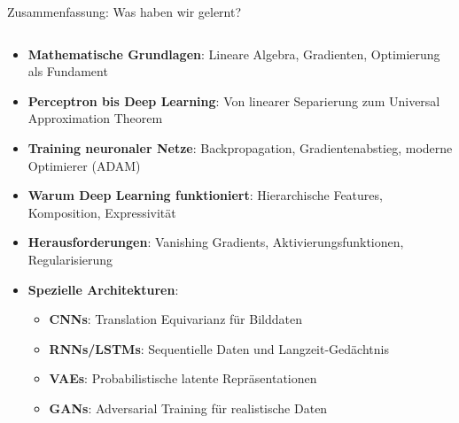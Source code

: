 \documentclass[aspectratio=1610, xcolor=dvipsnames, 9pt]{beamer}
\begin{document}
\begin{frame}{Zusammenfassung: Was haben wir gelernt?}
  \begin{columns}
    \begin{column}{1\textwidth}
      \begin{itemize}
        \item \textbf{Mathematische Grundlagen}: Lineare Algebra, Gradienten, Optimierung als Fundament
        \item \textbf{Perceptron bis Deep Learning}: Von linearer Separierung zum Universal Approximation Theorem
        \item \textbf{Training neuronaler Netze}: Backpropagation, Gradientenabstieg, moderne Optimierer (ADAM)
        \item \textbf{Warum Deep Learning funktioniert}: Hierarchische Features, Komposition, Expressivität
        \item \textbf{Herausforderungen}: Vanishing Gradients, Aktivierungsfunktionen, Regularisierung
        \item \textbf{Spezielle Architekturen}:
        \begin{itemize}
          \item \textbf{CNNs}: Translation Equivarianz für Bilddaten
          \item \textbf{RNNs/LSTMs}: Sequentielle Daten und Langzeit-Gedächtnis
          \item \textbf{VAEs}: Probabilistische latente Repräsentationen
          \item \textbf{GANs}: Adversarial Training für realistische Daten
        \end{itemize}
      \end{itemize}
    \end{column}
  \end{columns}
\end{frame}
\end{document}
